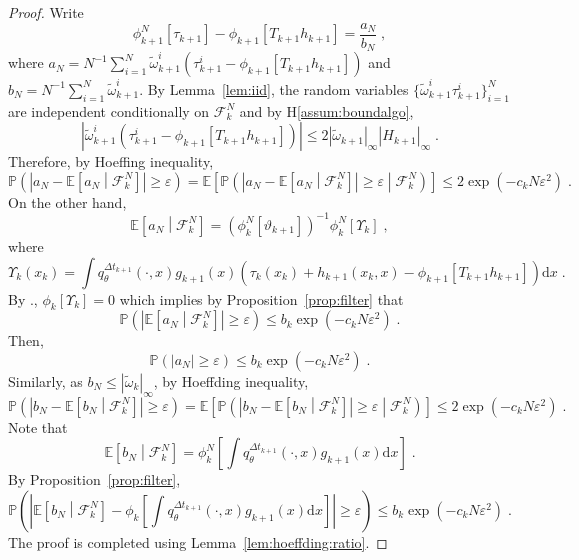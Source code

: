 \documentclass[12pt]{article}
\newcommand{\rmd}{\mathrm{d}}
\newcommand{\eqsp}{\;}
\newcommand{\1}{\mathrm{1}}
\begin{document}
\begin{proof}
Write
\[
\phi_{k+1}^N[\tau_{k+1}] - \phi_{k+1}\left[T_{k+1}h_{k+1}\right] = \frac{a_N}{b_N}\eqsp,
\]
where $a_N = N^{-1}\sum_{i=1}^N \widetilde{\omega}_{k+1}^i \left(\tau_{k+1}^i - \phi_{k+1}\left[T_{k+1}h_{k+1}\right]\right)$ and $b_N =N^{-1}\sum_{i=1}^N \widetilde{\omega}_{k+1}^i$. By Lemma~\ref{lem:iid}, the random variables $\{\widetilde{\omega}_{k+1}^i\tau_{k+1}^i\}_{i=1}^N$ are independent conditionally on $\mathcal{F}_k^{N}$ and by H\ref{assum:boundalgo},
\[
\left|\widetilde{\omega}_{k+1}^i \left(\tau_{k+1}^i - \phi_{k+1}\left[T_{k+1}h_{k+1}\right]\right)\right| \le 2|\widetilde{\omega}_{k+1}|_{\infty}|H_{k+1}|_{\infty}\eqsp.
\]
Therefore, by Hoeffing inequality,
\[
\mathbb{P}\left(\left|a_N - \mathbb{E}\left[a_N\middle|\mathcal{F}_k^{N}\right]\right|\ge \varepsilon\right) = \mathbb{E}\left[\mathbb{P}\left(\left|a_N - \mathbb{E}\left[a_N\middle|\mathcal{F}_k^{N}\right]\right|\ge \varepsilon\middle|\mathcal{F}_k^{N}\right)\right]\le 2\exp\left(-c_kN\varepsilon^2\right)\eqsp.
\] 
On the other hand,
\[
\mathbb{E}\left[a_N\middle|\mathcal{F}_k^{N}\right] = \left(\phi^N_{k}[\vartheta_{k+1}]\right)^{-1}\phi^N_{k}\left[\Upsilon_k\right] \eqsp,%
\]
where
\[
\Upsilon_k(x_k) = \int q_{\theta}^{\Delta t_{k+1}}(\cdot,x)g_{k+1}(x)\left(\tau_k(x_k) + h_{k+1}(x_k,x) - \phi_{k+1}\left[T_{k+1}h_{k+1}\right]\right)\rmd x\eqsp.
\]
By \cite[Lemma~11]{olsson:westerborn:2016}., $\phi_{k}\left[\Upsilon_k\right] = 0$ which implies by Proposition~\ref{prop:filter} that 
\[
\mathbb{P}\left(\left|\mathbb{E}\left[a_N\middle|\mathcal{F}_k^{N}\right]\right|\ge \varepsilon\right)\le b_k\exp\left(-c_kN\varepsilon^2\right)\eqsp.
\]
Then,
\[
\mathbb{P}\left(\left|a_N\right|\ge \varepsilon\right) \le b_k\exp\left(-c_kN\varepsilon^2\right)\eqsp.
\] 
Similarly, as $b_N \le |\widetilde{\omega}_k|_{\infty}$, by Hoeffding inequality,
\[
\mathbb{P}\left(\left|b_N - \mathbb{E}\left[b_N\middle|\mathcal{F}_k^{N}\right]\right|\ge \varepsilon\right) = \mathbb{E}\left[\mathbb{P}\left(\left|b_N - \mathbb{E}\left[b_N\middle|\mathcal{F}_k^{N}\right]\right|\ge \varepsilon\middle|\mathcal{F}_k^{N}\right)\right]\le 2\exp\left(-c_kN\varepsilon^2\right)\eqsp.
\] 
Note that
\[
\mathbb{E}\left[b_N\middle|\mathcal{F}_k^{N}\right] = \phi^N_{k}\left[\int q_{\theta}^{\Delta t_{k+1}}(\cdot,x)g_{k+1}(x)\rmd x\right]\eqsp.%
\]
By Proposition~\ref{prop:filter},
\[
\mathbb{P}\left(\left|\mathbb{E}\left[b_N\middle|\mathcal{F}_k^{N}\right]-\phi_k\left[\int q_{\theta}^{\Delta t_{k+1}}(\cdot,x)g_{k+1}(x)\rmd x\right]\right|\ge \varepsilon\right)\le b_k\exp\left(-c_kN\varepsilon^2\right)\eqsp.
\]
The proof is completed using Lemma~\ref{lem:hoeffding:ratio}.
\end{proof}
\end{document}
